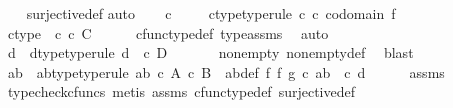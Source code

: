 \begin{isabellebody}
%
\isadelimproof
\ \ %
\endisadelimproof
%
\isatagproof
{}\isamarkupfalse%
\ surjective{\isacharunderscore}{\kern0pt}def\isanewline
{}\isamarkupfalse%
{\isacharparenleft}{\kern0pt}auto{\isacharparenright}{\kern0pt}\isanewline
\ \ \isamarkupfalse%
\ c\ \isanewline
\ \ \isamarkupfalse%
\ c{\isacharunderscore}{\kern0pt}type{\isacharbrackleft}{\kern0pt}type{\isacharunderscore}{\kern0pt}rule{\isacharbrackright}{\kern0pt}{\isacharcolon}{\kern0pt}\ {\isachardoublequoteopen}c\ {\isasymin}\isactrlsub c\ codomain\ f{\isachardoublequoteclose}\isanewline
\ \ \isamarkupfalse%
\ \isamarkupfalse%
\ c{\isacharunderscore}{\kern0pt}type{}{\isacharcolon}{\kern0pt}\ \ {\isachardoublequoteopen}c\ {\isasymin}\isactrlsub c\ C{\isachardoublequoteclose}\isanewline
\ \ \ \ \isamarkupfalse%
\ cfunc{\isacharunderscore}{\kern0pt}type{\isacharunderscore}{\kern0pt}def\ type{\isacharunderscore}{\kern0pt}assms{\isacharparenleft}{\kern0pt}{}{\isacharparenright}{\kern0pt}\ \isamarkupfalse%
\ auto\isanewline
\ \ \isamarkupfalse%
\ d\ \ d{\isacharunderscore}{\kern0pt}type{\isacharbrackleft}{\kern0pt}type{\isacharunderscore}{\kern0pt}rule{\isacharbrackright}{\kern0pt}{\isacharcolon}{\kern0pt}\ {\isachardoublequoteopen}d\ \ {\isasymin}\isactrlsub c\ D{\isachardoublequoteclose}\ \isanewline
\ \ \ \ \isamarkupfalse%
\ nonempty\ nonempty{\isacharunderscore}{\kern0pt}def\ \isamarkupfalse%
\ blast\isanewline
\ \ \isamarkupfalse%
\ \isamarkupfalse%
\ ab\ \ ab{\isacharunderscore}{\kern0pt}type{\isacharbrackleft}{\kern0pt}type{\isacharunderscore}{\kern0pt}rule{\isacharbrackright}{\kern0pt}{\isacharcolon}{\kern0pt}\ {\isachardoublequoteopen}ab\ {\isasymin}\isactrlsub c\ A\ {\isasymtimes}\isactrlsub c\ B{\isachardoublequoteclose}\ \ ab{\isacharunderscore}{\kern0pt}def{\isacharcolon}{\kern0pt}\ {\isachardoublequoteopen}{\isacharparenleft}{\kern0pt}f\ {\isasymtimes}\isactrlsub f\ g{\isacharparenright}{\kern0pt}\ {\isasymcirc}\isactrlsub c\ ab\ {\isacharequal}{\kern0pt}\ {\isasymlangle}c{\isacharcomma}{\kern0pt}\ d{\isasymrangle}{\isachardoublequoteclose}\isanewline
\ \ \ \ \isamarkupfalse%
\ assms\ \isamarkupfalse%
\ {\isacharparenleft}{\kern0pt}typecheck{\isacharunderscore}{\kern0pt}cfuncs{\isacharcomma}{\kern0pt}\ metis\ assms{\isacharparenleft}{\kern0pt}{}{\isacharparenright}{\kern0pt}\ cfunc{\isacharunderscore}{\kern0pt}type{\isacharunderscore}{\kern0pt}def\ surjective{\isacharunderscore}{\kern0pt}def{}{\isacharparenright}{\kern0pt}\isanewline

\end{isabellebody}
